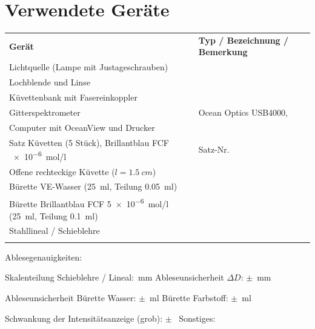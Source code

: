 \documentclass{article}
\newcommand{\bl}[1][2cm]{\underline{\hspace{#1}}}
\newcommand{\blu}[2][2cm]{\mbox{\bl[#1]\,\si{#2}}}
\begin{document}
\section{Verwendete Ger\"ate}

\begin{tabular}{@{}L{6.6cm}L{8.6cm}@{}}
  \textbf{Ger\"at} & \textbf{Typ / Bezeichnung / Bemerkung} \\[5pt]
  Lichtquelle (Lampe mit Justageschrauben) & \bl[7cm] \\[7pt]
  Lochblende und Linse                     & \bl[7cm] \\[7pt]
  K\"uvettenbank mit Fasereinkoppler       & \bl[7cm] \\[7pt]
  Gitterspektrometer                       & Ocean Optics USB4000, \bl[3.5cm] \\[7pt]
  Computer mit OceanView und Drucker       & \bl[7cm] \\[7pt]
  Satz K\"uvetten (5 St\"uck), Brillantblau FCF \SI{e-6}{mol/l}
                                           & Satz-Nr.\ \bl[5.5cm] \\[12pt]
  Offene rechteckige K\"uvette ($l = \SI{1,5}{cm}$) & \bl[7cm] \\[7pt]
  B\"urette VE-Wasser (\SI{25}{ml}, Teilung \SI{0,05}{ml}) & \bl[7cm] \\[12pt]
  B\"urette Brillantblau FCF \SI{5e-6}{mol/l} (\SI{25}{ml}, Teilung \SI{0,1}{ml})
                                           & \bl[7cm] \\[12pt]
  Stahllineal / Schieblehre                & \bl[7cm] \\[7pt]
  \bl[6cm]                                 & \bl[7cm] \\[7pt]
\end{tabular}

\vspace{0.35cm}

\noindent Ablesegenauigkeiten:

\vspace{0.2cm}
\noindent Skalenteilung Schieblehre / Lineal: \blu[2cm]{mm} \qquad
Ableseunsicherheit $\Delta D$: $\pm$ \blu[1.8cm]{mm}

\vspace{0.25cm}
\noindent Ableseunsicherheit B\"urette Wasser: $\pm$ \blu[1.8cm]{ml} \qquad
B\"urette Farbstoff: $\pm$ \blu[1.8cm]{ml}

\vspace{0.25cm}
\noindent Schwankung der Intensit\"atsanzeige (grob): $\pm$ \blu[2cm]{\counts}
\qquad Sonstiges: \bl[4cm]
\end{document}
